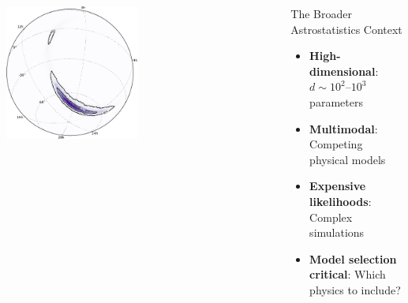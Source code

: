 \documentclass[aspectratio=169]{beamer}
\begin{document}
\begin{frame}
\begin{columns}
        \includegraphics[width=0.49\textwidth]{figures/ligo_lambert-skymap}
        \vspace{10pt}
        \begin{block}{The Broader Astrostatistics Context}
            \begin{itemize}
                \item \textbf{High-dimensional}: $d \sim 10^2$--$10^3$ parameters
                \item \textbf{Multimodal}: Competing physical models
                \item \textbf{Expensive likelihoods}: Complex simulations
                \item \textbf{Model selection critical}: Which physics to include?
            \end{itemize}
        \end{block}
    \end{columns}
\end{frame}
\end{document}
